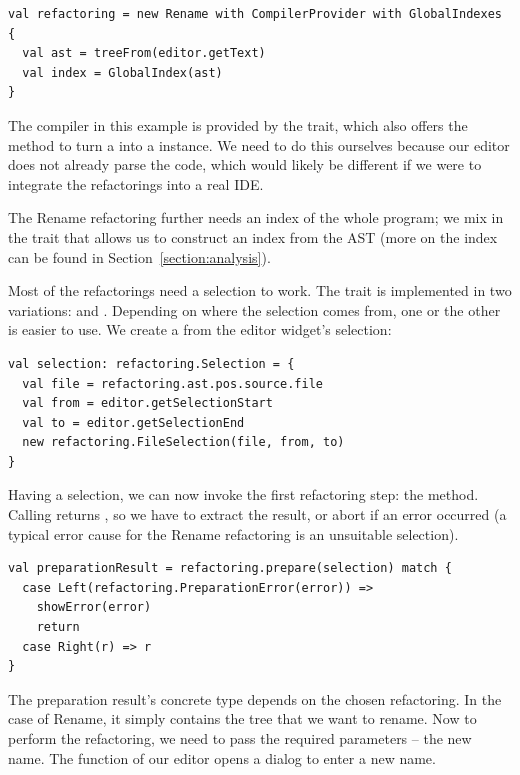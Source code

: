 \documentclass[10pt,a4paper,oneside]{scrreprt}
\begin{document}
\begin{lstlisting}
val refactoring = new Rename with CompilerProvider with GlobalIndexes {
  val ast = treeFrom(editor.getText)
  val index = GlobalIndex(ast)
}
\end{lstlisting}

The compiler in this example is provided by the  trait, which also offers the  method to turn a  into a  instance. We need to do this ourselves because our editor does not already parse the code, which would likely be different if we were to integrate the refactorings into a real IDE.

The Rename refactoring further needs an index of the whole program; we mix in the  trait that allows us to construct an index from the AST (more on the index can be found in Section~\vref{section:analysis}).

Most of the refactorings need a selection to work. The  trait is implemented in two variations:  and . Depending on where the selection comes from, one or the other is easier to use. We create a  from the editor widget's selection:

\begin{lstlisting}
val selection: refactoring.Selection = {
  val file = refactoring.ast.pos.source.file
  val from = editor.getSelectionStart
  val to = editor.getSelectionEnd
  new refactoring.FileSelection(file, from, to)
}
\end{lstlisting}

Having a selection, we can now invoke the first refactoring step: the  method. Calling  returns , so we have to extract the result, or abort if an error occurred (a typical error cause for the Rename refactoring is an unsuitable selection).



\begin{lstlisting}
val preparationResult = refactoring.prepare(selection) match {
  case Left(refactoring.PreparationError(error)) => 
    showError(error)
    return
  case Right(r) => r
}
\end{lstlisting}

The preparation result's concrete type depends on the chosen refactoring. In the case of Rename, it simply contains the tree that we want to rename. Now to perform the refactoring, we need to pass the required parameters -- the new name. The  function of our editor opens a dialog to enter a new name.
\end{document}
